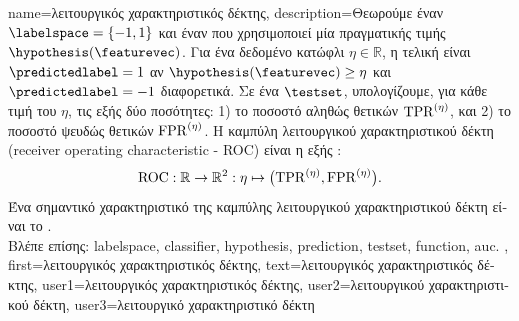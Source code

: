 {name={\foreignlanguage{greek}{λειτουργικός χαρακτηριστικός δέκτης}}, 
	description={\foreignlanguage{greek}{Θεωρούμε έναν}  $\labelspace=\{-1,1\}$ \foreignlanguage{greek}{και έναν} 
		 \foreignlanguage{greek}{που χρησιμοποιεί μία}  \foreignlanguage{greek}{πραγματικής τιμής 
		$\hypothesis(\featurevec)$. Για ένα δεδομένο κατώφλι $\eta \in \mathbb{R}$, η τελική}  
		\foreignlanguage{greek}{είναι $\predictedlabel=1$ αν $\hypothesis(\featurevec)\geq \eta$ και $\predictedlabel=-1$ διαφορετικά. 
 		Σε ένα}  $\testset$, \foreignlanguage{greek}{υπολογίζουμε, για κάθε τιμή του $\eta$, τις εξής δύο ποσότητες:
		1) το ποσοστό αληθώς θετικών ${\rm TPR}^{(\eta)}$, και 2) το ποσοστό ψευδώς θετικών ${\rm FPR}^{(\eta)}$. 
 		Η καμπύλη λειτουργικού χαρακτηριστικού δέκτη} 
		(receiver operating characteristic - ROC) \foreignlanguage{greek}{είναι η εξής}  \cite{IntroROCFawcett}:
 		$${\rm ROC}: \mathbb{R} \rightarrow \mathbb{R}^{2}: \eta \mapsto \big({\rm TPR}^{(\eta)}, {\rm FPR}^{(\eta)} \big).$$ 
 	        \foreignlanguage{greek}{Ένα σημαντικό χαρακτηριστικό της καμπύλης λειτουργικού χαρακτηριστικού δέκτη είναι το} .
	        \\ 
 		\foreignlanguage{greek}{Βλέπε επίσης:} \gls{labelspace}, \gls{classifier}, \gls{hypothesis}, \gls{prediction}, \gls{testset}, \gls{function}, \gls{auc}. }, 
  	first={\foreignlanguage{greek}{λειτουργικός χαρακτηριστικός δέκτης}}, 
  	text={\foreignlanguage{greek}{λειτουργικός χαρακτηριστικός δέκτης}},
	user1={\foreignlanguage{greek}{λειτουργικός χαρακτηριστικός δέκτης}}, %
	user2={\foreignlanguage{greek}{λειτουργικού χαρακτηριστικού δέκτη}}, %
	user3={\foreignlanguage{greek}{λειτουργικό χαρακτηριστικό δέκτη}} %
}%

